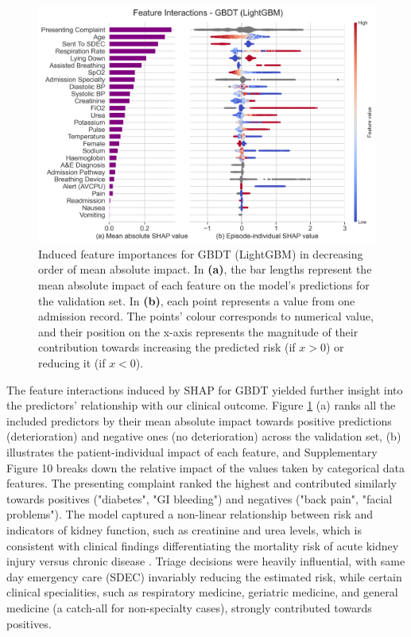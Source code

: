\documentclass[fleqn,10pt]{wlscirep}
\begin{document}
\begin{figure}[tb]
    \centering
    \includegraphics[width=\linewidth]{images/shap_lgbm.png}
    \caption{Induced feature importances for GBDT (LightGBM) in decreasing order of mean absolute impact. In \textbf{(a)}, the bar lengths represent the mean absolute impact of each feature on the model's predictions for the validation set. In \textbf{(b)}, each point represents a value from one admission record. The points' colour corresponds to numerical value, and their position on the x-axis represents the magnitude of their contribution towards increasing the predicted risk (if $x>0$) or reducing it (if $x<0$).}
    \label{fig:shap_lightgbm}
\end{figure}

The feature interactions induced by SHAP for GBDT yielded further insight into the predictors' relationship with our clinical outcome. Figure \ref{fig:shap_lightgbm} (a) ranks all the included predictors by their mean absolute impact towards positive predictions (deterioration) and negative ones (no deterioration) across the validation set, (b) illustrates the patient-individual impact of each feature, and Supplementary Figure 10 breaks down the relative impact of the values taken by categorical data features. The presenting complaint ranked the highest and contributed similarly towards positives ("diabetes", "GI bleeding") and negatives ("back pain", "facial problems"). The model captured a non-linear relationship between risk and indicators of kidney function, such as creatinine and urea levels, which is consistent with clinical findings differentiating the mortality risk of acute kidney injury versus chronic disease \cite{James20}. Triage decisions were heavily influential, with same day emergency care (SDEC) invariably reducing the estimated risk, while certain clinical specialities, such as respiratory medicine, geriatric medicine, and general medicine (a catch-all for non-specialty cases), strongly contributed towards positives.
\end{document}
